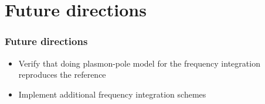 \section{Future directions}
\begin{frame}
\frametitle{Future directions}
\begin{itemize}
    \item Verify that doing plasmon-pole model for the frequency integration reproduces the reference
    \pause
    \item Implement additional frequency integration schemes
\end{itemize}
\end{frame}